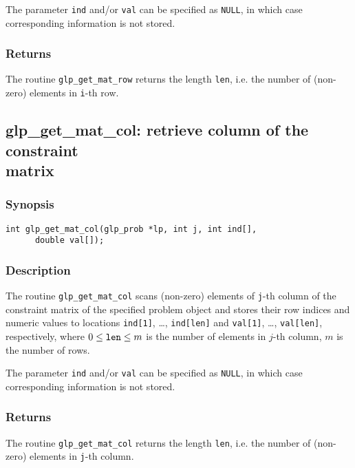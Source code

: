 The parameter \verb|ind| and/or \verb|val| can be specified as
\verb|NULL|, in which case corresponding information is not stored.

\subsubsection*{Returns}

The routine \verb|glp_get_mat_row| returns the length \verb|len|, i.e.
the number of (non-zero) elements in \verb|i|-th row.

\subsection{glp\_get\_mat\_col: retrieve column of the constraint\\
matrix}

\subsubsection*{Synopsis}

\begin{verbatim}
int glp_get_mat_col(glp_prob *lp, int j, int ind[],
      double val[]);
\end{verbatim}

\subsubsection*{Description}

The routine \verb|glp_get_mat_col| scans (non-zero) elements of
\verb|j|-th column of the constraint matrix of the specified problem
object and stores their row indices and numeric values to locations
\verb|ind[1]|, \dots, \verb|ind[len]| and \verb|val[1]|, \dots,
\verb|val[len]|, respectively, where $0\leq{\tt len}\leq m$ is the
number of elements in $j$-th column, $m$ is the number of rows.

The parameter \verb|ind| and/or \verb|val| can be specified as
\verb|NULL|, in which case corresponding information is not stored.

\subsubsection*{Returns}

The routine \verb|glp_get_mat_col| returns the length \verb|len|, i.e.
the number of (non-zero) elements in \verb|j|-th column.


